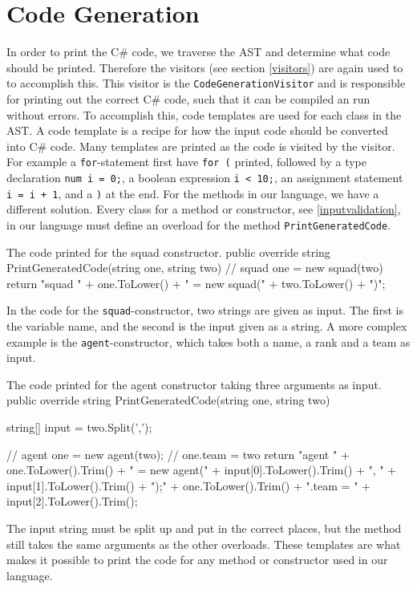 \section{Code Generation}
In order to print the C\# code, we traverse the AST and determine what code should be printed. 
Therefore the visitors (see section \ref{visitors}) are again used to to accomplish this.
This visitor is the \texttt{CodeGenerationVisitor} and is responsible for printing out the correct C\# code, such that it can be compiled an run without errors. 
To accomplish this, code templates are used for each class in the AST. \newline
A code template is a recipe for how the input code should be converted into C\# code. 
Many templates are printed as the code is visited by the visitor. 
For example a \texttt{for}-statement first have \texttt{for (} printed, followed by a type declaration \texttt{num i = 0;}, a boolean expression \texttt{i < 10;}, an assignment statement \texttt{i = i + 1}, and a \texttt{)} at the end.\newline
For the methods in our language, we have a different solution. 
Every class for a method or constructor, see \ref{inputvalidation}, in our language must define an overload for the method \texttt{PrintGeneratedCode}. 

\begin{source}{The code printed for the squad constructor.}{}
public override string PrintGeneratedCode(string one, string two)
        {
            // squad one = new squad(two)
            return "squad " + one.ToLower() + " = new squad(" + two.ToLower() + ")";
        }
\end{source}

In the code for the \texttt{squad}-constructor, two strings are given as input. 
The first is the variable name, and the second is the input given as a string. 
A more complex example is the \texttt{agent}-constructor, which takes both a name, a rank and a team as input.

\begin{source}{The code printed for the agent constructor taking three arguments as input.}{}
public override string PrintGeneratedCode(string one, string two)
        {
            string[] input = two.Split(',');
						
            // agent one = new agent(two);
            // one.team = two
            return "agent " + one.ToLower().Trim() + 
							" = new agent(" + input[0].ToLower().Trim() + 
							", " + input[1].ToLower().Trim() + ");\n" + 
							one.ToLower().Trim() + ".team = " + 
							input[2].ToLower().Trim();
        }
\end{source}

The input string must be split up and put in the correct places, but the method still takes the same arguments as the other overloads. 
These templates are what makes it possible to print the code for any method or constructor used in our language.